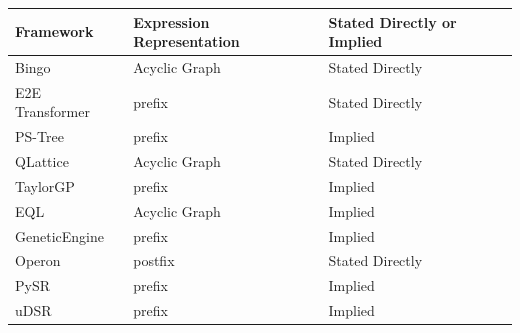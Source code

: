 \documentclass[runningheads]{llncs}
\begin{document}
\begin{table}
\begin{tabular*}{\textwidth}{lll} %
\hline
Framework&Expression Representation & Stated Directly or Implied\\
\hline
Bingo \cite{10.1145/3520304.3534031} &Acyclic Graph & Stated Directly\\ %
E2E Transformer \cite{kamienny2022endtoend} &prefix & Stated Directly\\ %
PS-Tree \cite{zhang2022ps} &prefix & Implied \\ %
QLattice \cite{Brolos2021AnAT} & Acyclic Graph & Stated Directly\\ %
TaylorGP \cite{10.1145/3512290.3528757} & prefix & Implied \\ %
EQL \cite{pmlr-v80-sahoo18a} & Acyclic Graph & Implied\\%
GeneticEngine \cite{10.1145/3564719.3568697} & prefix & Implied \\ %
Operon \cite{10.1145/3377929.3398099} & postfix  & Stated Directly \\ %
PySR \cite{cranmer2023interpretable} & prefix & Implied \\%
uDSR \cite{NEURIPS2022_dbca58f3} & prefix & Implied \\ %

\end{tabular*}
\end{table}
\end{document}
